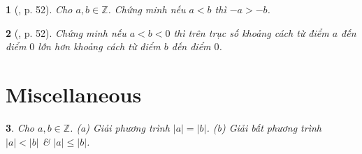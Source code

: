 \documentclass{article}
\newtheorem{baitoan}{}
\begin{document}
\begin{baitoan}[\cite{Binh_boi_duong_Toan_6_tap_1}, p. 52]
	Cho $a,b\in\mathbb{Z}$. Chứng minh nếu $a < b$ thì $-a > -b$.	
\end{baitoan}

\begin{baitoan}[\cite{Binh_boi_duong_Toan_6_tap_1}, p. 52]
	Chứng minh nếu $a < b < 0$ thì trên trục số khoảng cách từ điểm $a$ đến điểm $0$ lớn hơn khoảng cách từ điểm $b$ đến điểm $0$.	
\end{baitoan}


\section{Miscellaneous}

\begin{baitoan}
	Cho $a,b\in\mathbb{Z}$. (a) Giải phương trình $|a| = |b|$. (b) Giải bất phương trình $|a| < |b|$ \& $|a|\le|b|$.
\end{baitoan}


\printbibliography[heading=bibintoc]
\end{document}
